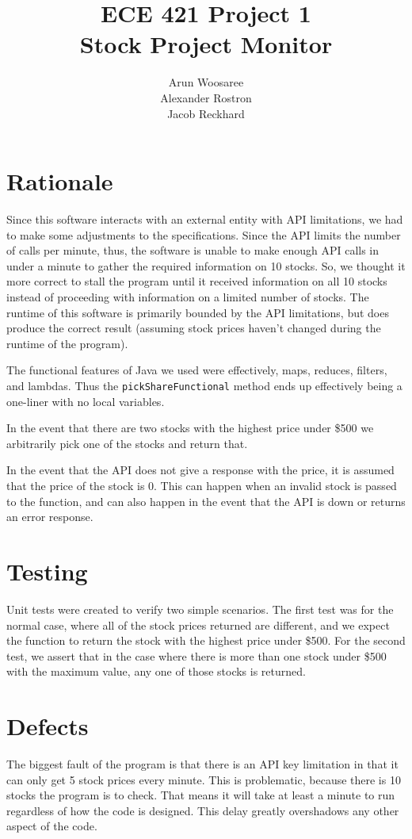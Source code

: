 \documentclass[letterpaper]{article}
\title{ECE 421 Project 1\\
Stock Project Monitor}
\author{Arun Woosaree\\
Alexander Rostron\\
Jacob Reckhard
}
\begin{document}
\maketitle %

\section{Rationale}
Since this software interacts with an external entity with API
limitations, we had to make some adjustments to the
specifications. Since the API limits the number of calls per minute,
thus, the software is unable to make enough API calls in under a
minute to gather the required information on 10 stocks. So, we thought
it more correct to stall the program until it received information on
all 10 stocks instead of proceeding with information on a limited
number of stocks. The runtime of this software is primarily bounded by
the API limitations, but does produce the correct result (assuming
stock prices haven't changed during the runtime of the program).

The functional features of Java we used were effectively, maps,
reduces, filters, and lambdas. Thus the \texttt{pickShareFunctional} method
ends up effectively being a one-liner with no local variables.

In the event that there are two stocks with the highest price under \$500 we
arbitrarily pick one of the stocks and return that.

In the event that the API does not give a response with the price, it is assumed
that the price of the stock is 0. This can happen when an invalid stock is
passed to the function, and can also happen in the event that the API is down or
returns an error response.

\section{Testing}
Unit tests were created to verify two simple scenarios. The first test was for
the normal case, where all of the stock prices returned are different, and we
expect the function to return the stock with the highest price under \$500. For
the second test, we assert that in the case where there is more than one
stock under \$500 with the maximum value, any one of those stocks is returned. 

\section{Defects}

The biggest fault of the program is that there is an API key
limitation in that it can only get 5 stock prices every minute. This
is problematic, because there is 10 stocks the program is to
check. That means it will take at least a minute to run regardless of
how the code is designed. This delay greatly overshadows any other
aspect of the code.
\end{document}
